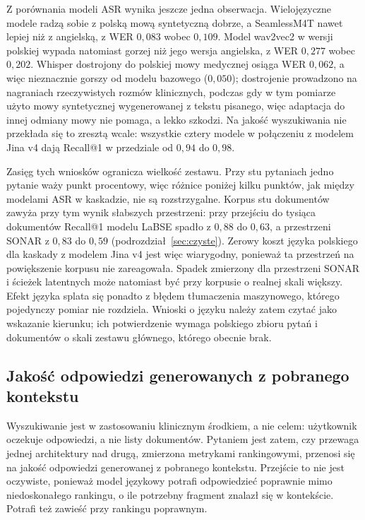 Z porównania modeli ASR wynika jeszcze jedna obserwacja. Wielojęzyczne modele radzą sobie z polską
mową syntetyczną dobrze, a SeamlessM4T nawet lepiej niż z angielską, z WER $0{,}083$ wobec
$0{,}109$. Model wav2vec2 w wersji polskiej wypada natomiast gorzej niż jego wersja angielska,
z WER $0{,}277$ wobec $0{,}202$. Whisper dostrojony do polskiej mowy medycznej osiąga WER $0{,}062$,
a więc nieznacznie gorszy od modelu bazowego ($0{,}050$); dostrojenie prowadzono na nagraniach
rzeczywistych rozmów klinicznych, podczas gdy w tym pomiarze użyto mowy syntetycznej
wygenerowanej z tekstu pisanego, więc adaptacja do innej odmiany mowy nie pomaga, a lekko szkodzi.
Na jakość wyszukiwania nie przekłada się to zresztą wcale: wszystkie cztery modele w połączeniu
z modelem Jina v4 dają Recall@1 w przedziale od $0{,}94$ do $0{,}98$.

Zasięg tych wniosków ogranicza wielkość zestawu. Przy stu pytaniach jedno pytanie waży punkt
procentowy, więc różnice poniżej kilku punktów, jak między modelami ASR w kaskadzie, nie są
rozstrzygalne. Korpus stu dokumentów zawyża przy tym wynik słabszych przestrzeni: przy przejściu
do tysiąca dokumentów Recall@1 modelu LaBSE spadło z $0{,}88$ do $0{,}63$, a przestrzeni SONAR
z $0{,}83$ do $0{,}59$ (podrozdział~\ref{sec:czyste}). Zerowy koszt języka polskiego dla kaskady
z modelem Jina v4 jest więc wiarygodny, ponieważ ta przestrzeń na powiększenie korpusu nie
zareagowała. Spadek zmierzony dla przestrzeni SONAR i ścieżek latentnych może natomiast być przy
korpusie o realnej skali większy. Efekt języka splata się ponadto z błędem tłumaczenia
maszynowego, którego pojedynczy pomiar nie rozdziela. Wnioski o języku należy zatem czytać jako
wskazanie kierunku; ich potwierdzenie wymaga polskiego zbioru pytań i dokumentów o skali zestawu
głównego, którego obecnie brak.

\subsection{Jakość odpowiedzi generowanych z pobranego kontekstu}
\label{sec:generacja}
Wyszukiwanie jest w zastosowaniu klinicznym środkiem, a nie celem: użytkownik oczekuje odpowiedzi,
a nie listy dokumentów. Pytaniem jest zatem, czy przewaga jednej architektury nad drugą, zmierzona metrykami
rankingowymi, przenosi się na jakość odpowiedzi generowanej z pobranego kontekstu. Przejście to nie jest oczywiste, ponieważ model językowy potrafi odpowiedzieć poprawnie
mimo niedoskonałego rankingu, o ile potrzebny fragment znalazł się w kontekście. Potrafi też
zawieść przy rankingu poprawnym.


